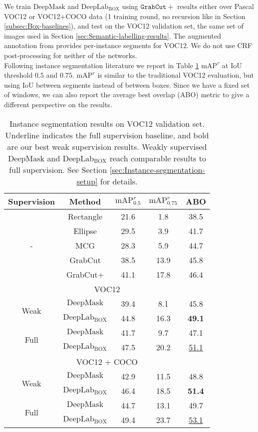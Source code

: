 \documentclass[10pt,english,british,twocolumn]{article}
\providecommand{\tabularnewline}{\\}
\begin{document}
We train $\mathrm{DeepMask}$ and $\mathrm{DeepLab_{BOX}}$ using
$\mathtt{GrabCut+}$ results either over Pascal VOC12 or VOC12+COCO
data (1 training round, no recursion like in Section \ref{subsec:Box-baselines}),
and test on the VOC12 validation set, the same set of images used
in Section \ref{sec:Semantic-labelling-results}. The augmented annotation
from \cite{Hariharan2011Iccv} provides per-instance segments for
VOC12. We do not use CRF post-processing for neither of the networks.\\
Following instance segmentation literature \cite{Hariharan2014Eccv,Hariharan2015Cvpr}
we report in Table \ref{tab:Instance-segmentation-results} $\text{mAP}^{r}$
at IoU threshold $0.5$ and $0.75$. $\text{mAP}^{r}$ is similar
to the traditional VOC12 evaluation, but using IoU between segments
instead of between boxes. Since we have a fixed set of windows, we
can also report the average best overlap (ABO) \cite{PontTuset2015Iccv}
metric to give a different perspective on the results.
\begin{table}
\begin{centering}
\begin{tabular}{cc|cc|c}
Supervision & Method & $\text{mAP}_{0.5}^{r}$\hspace*{-1em} & $\text{mAP}_{0.75}^{r}$ & ABO\tabularnewline
\hline 
\hline 
\multirow{5}{*}{- } & Rectangle\textsuperscript{} & 21.6 & 1.8 & 38.5\tabularnewline
 & Ellipse & 29.5 & 3.9 & 41.7\tabularnewline
 & MCG & 28.3 & 5.9 & 44.7\tabularnewline
 & GrabCut & 38.5 & 13.9 & 45.8\tabularnewline
 & GrabCut+ & 41.1 & 17.8 & 46.4\tabularnewline
\hline 
\hline 
\multicolumn{5}{c}{\cellcolor{verylightgray}VOC12}\tabularnewline
\multirow{2}{*}{Weak} & $\mathrm{DeepMask}$ & 39.4 & 8.1 & 45.8\tabularnewline
 & $\mathrm{DeepLab_{BOX}}$ & 44.8 & 16.3 & \textbf{49.1}\tabularnewline
\hline 
\multirow{2}{*}{Full} & $\mathrm{DeepMask}$ & 41.7 & 9.7 & 47.1\tabularnewline
 & $\mathrm{DeepLab_{BOX}}$ & 47.5 & 20.2 & \uline{51.1}\tabularnewline
\hline 
\hline 
\multicolumn{5}{c}{\cellcolor{verylightgray}VOC12 + COCO}\tabularnewline
\multirow{2}{*}{Weak} & $\mathrm{DeepMask}$ & 42.9 & 11.5 & 48.8\tabularnewline
 & $\mathrm{DeepLab_{BOX}}$ & 46.4 & 18.5 & \textbf{51.4}\tabularnewline
\hline 
\multirow{2}{*}{Full} & $\mathrm{DeepMask}$ & 44.7 & 13.1 & 49.7\tabularnewline
 & $\mathrm{DeepLab_{BOX}}$ & 49.4 & 23.7 & \uline{53.1}\tabularnewline
\end{tabular}\vspace{-0.5em}
\caption{\label{tab:Instance-segmentation-results}Instance segmentation results
on VOC12 validation set. Underline indicates the full supervision
baseline, and bold are our best weak supervision results. Weakly supervised
$\mathrm{DeepMask}$ and $\mathrm{DeepLab_{BOX}}$ reach comparable
results to full supervision. See Section \ref{sec:Instance-segmentation-setup}
for details. }
\par\end{centering}
\vspace{-1em}
\end{table}
\end{document}

